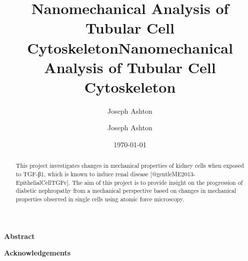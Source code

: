 \documentclass[
  paper=a4,
  ,captions=tableheading
]{scrartcl}
\title{Nanomechanical Analysis of Tubular Cell Cytoskeleton}
\author{Joseph Ashton}
\date{\today}
\title{Nanomechanical Analysis of Tubular Cell Cytoskeleton}
\author{Joseph Ashton}
\date{}
\begin{document}
\begin{titlepage}
\newcommand{\colorRule}[3][black]{\textcolor[HTML]{#1}{\rule{#2}{#3}}}
\end{titlepage}
\restoregeometry
{} 


{} %

\begin{center}
 {\LARGE \textbf{\textsf{Abstract}}}
\end{center}

\begin{abstract}
\begin{justify}
    This project investigates changes in mechanical properties of kidney
    cells when exposed to TGF-β1, which is known to induce renal disease
    {[}@gentleME2013-EpithelialCellTGFv{]}. The aim of this project is
    to provide insight on the progression of diabetic nephropathy from a
    mechanical perspective based on changes in mechanical properties
    observed in single cells using atomic force microscopy.
  \end{justify}
\end{abstract}
\pagebreak


\begin{center}
 {\LARGE \textbf{\textsf{Acknowledgements}}}
\end{center}
\end{document}
